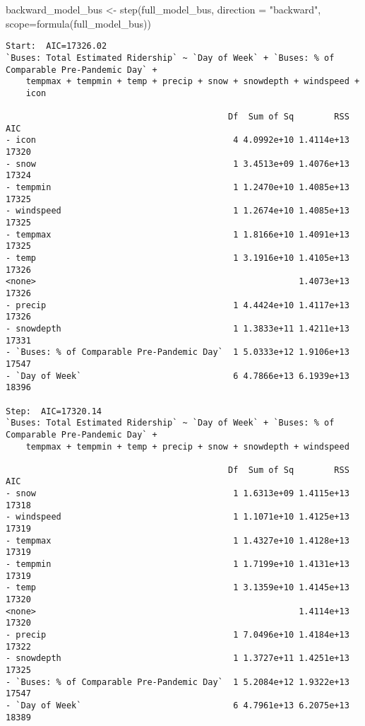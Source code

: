 \documentclass[
  letterpaper,
  DIV=11,
  numbers=noendperiod]{scrartcl}
\newenvironment{Shaded}{\begin{snugshade}}{\end{snugshade}}
\newcommand{\AttributeTok}[1]{\textcolor[rgb]{0.40,0.45,0.13}{#1}}
\newcommand{\FunctionTok}[1]{\textcolor[rgb]{0.28,0.35,0.67}{#1}}
\newcommand{\NormalTok}[1]{\textcolor[rgb]{0.00,0.23,0.31}{#1}}
\newcommand{\OtherTok}[1]{\textcolor[rgb]{0.00,0.23,0.31}{#1}}
\newcommand{\StringTok}[1]{\textcolor[rgb]{0.13,0.47,0.30}{#1}}
\begin{document}
\begin{Shaded}
\begin{Highlighting}[]
\NormalTok{backward\_model\_bus }\OtherTok{\textless{}{-}} \FunctionTok{step}\NormalTok{(full\_model\_bus, }\AttributeTok{direction =} \StringTok{"backward"}\NormalTok{, }\AttributeTok{scope=}\FunctionTok{formula}\NormalTok{(full\_model\_bus))}
\end{Highlighting}
\end{Shaded}

\begin{verbatim}
Start:  AIC=17326.02
`Buses: Total Estimated Ridership` ~ `Day of Week` + `Buses: % of Comparable Pre-Pandemic Day` + 
    tempmax + tempmin + temp + precip + snow + snowdepth + windspeed + 
    icon

                                            Df  Sum of Sq        RSS   AIC
- icon                                       4 4.0992e+10 1.4114e+13 17320
- snow                                       1 3.4513e+09 1.4076e+13 17324
- tempmin                                    1 1.2470e+10 1.4085e+13 17325
- windspeed                                  1 1.2674e+10 1.4085e+13 17325
- tempmax                                    1 1.8166e+10 1.4091e+13 17325
- temp                                       1 3.1916e+10 1.4105e+13 17326
<none>                                                    1.4073e+13 17326
- precip                                     1 4.4424e+10 1.4117e+13 17326
- snowdepth                                  1 1.3833e+11 1.4211e+13 17331
- `Buses: % of Comparable Pre-Pandemic Day`  1 5.0333e+12 1.9106e+13 17547
- `Day of Week`                              6 4.7866e+13 6.1939e+13 18396

Step:  AIC=17320.14
`Buses: Total Estimated Ridership` ~ `Day of Week` + `Buses: % of Comparable Pre-Pandemic Day` + 
    tempmax + tempmin + temp + precip + snow + snowdepth + windspeed

                                            Df  Sum of Sq        RSS   AIC
- snow                                       1 1.6313e+09 1.4115e+13 17318
- windspeed                                  1 1.1071e+10 1.4125e+13 17319
- tempmax                                    1 1.4327e+10 1.4128e+13 17319
- tempmin                                    1 1.7199e+10 1.4131e+13 17319
- temp                                       1 3.1359e+10 1.4145e+13 17320
<none>                                                    1.4114e+13 17320
- precip                                     1 7.0496e+10 1.4184e+13 17322
- snowdepth                                  1 1.3727e+11 1.4251e+13 17325
- `Buses: % of Comparable Pre-Pandemic Day`  1 5.2084e+12 1.9322e+13 17547
- `Day of Week`                              6 4.7961e+13 6.2075e+13 18389


\end{verbatim}
\end{document}
